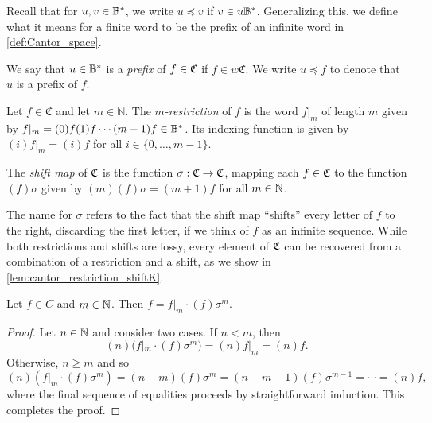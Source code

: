 Recall that for \(u, v\in \mathbb{B}^*\), we write \(u\preceq v\) if \(v\in u\mathbb{B}^*\).
Generalizing this, we define what it means for a finite word to be the prefix of an infinite
word in \cref{def:Cantor_space}.
\begin{definition}\label{def:finite_prefix_of_cantor}
We say that \(u\in \mathbb{B}^*\) is a \emph{prefix} of \(f\in \mathfrak{C}\) if \(f\in w\mathfrak{C}\). We write $u \preceq f$
to denote that $u$ is a prefix of $f$.
\end{definition}

\begin{definition}\label{def:restriction_of_infinite_string}
Let \(f\in \mathfrak{C}\) and let \(m\in \mathbb{N}\). The \emph{$m$-restriction} of $f$ is the word
$f|_m$ of length $m$ given by \(f|_m = (0)f(1)f\cdots (m-1)f \in \mathbb{B}^\ast\).
Its indexing function is given by \((i)f|_m=(i)f\) for all \(i\in \{0, \ldots, m-1\}\).
\end{definition}

\begin{definition}\label{def:cantor_shift}
    The \emph{shift map} of $\mathfrak{C}$ is the function $\sigma: \mathfrak{C} \rightarrow \mathfrak{C}$, mapping each $f\in \mathfrak{C}$ to the function $(f)\sigma$
    given by $(m)(f)\sigma = (m+1)f$ for all $m\in {\mathbb{N}}$.
\end{definition}

The name for $\sigma$ refers to the fact that the shift map ``shifts'' every letter of $f$ to the right, discarding the first letter, if we think of
$f$ as an infinite sequence.
While both restrictions and shifts are lossy, every element of $\mathfrak{C}$ can be recovered from  a combination of a restriction and a shift, as we show in
\cref{lem:cantor_restriction_shiftK}.

\begin{lemma}\label{lem:cantor_restriction_shiftK}
    Let $f\in C$ and $m \in {\mathbb{N}}$. Then $f = f|_m \cdot (f)\sigma^m$.
\end{lemma}
\begin{proof}
    Let $n \in {\mathbb{N}}$ and consider two cases. If $n < m$, then
    \[(n) (f|_m \cdot (f)\sigma^m) = (n)f|_m = (n)f.\]
    Otherwise, $n \geq m$ and so
    \[(n)(f|_m \cdot (f)\sigma^m) = (n-m)(f)\sigma^m = (n-m+1)(f)\sigma^{m-1} = \cdots = (n)f,\]
    where the final sequence of equalities proceeds by straightforward induction. This completes the proof.
\end{proof}

